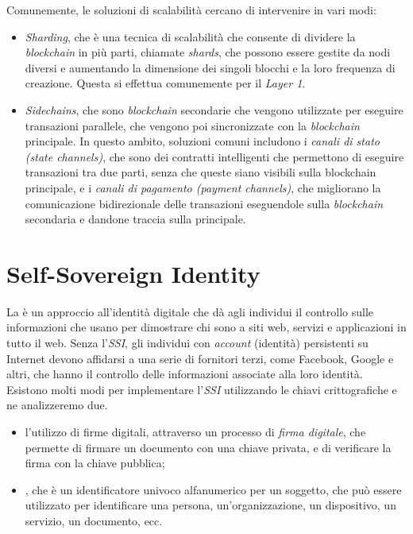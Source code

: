 Comunemente, le soluzioni di scalabilità cercano di intervenire in vari modi:
\begin{itemize}
    \item{\textit{Sharding}}, che è una tecnica di scalabilità che consente di dividere la \textit{blockchain} in più parti, chiamate \textit{shards}, che possono essere gestite da nodi diversi e aumentando
    la dimensione dei singoli blocchi e la loro frequenza di creazione. Questa si effettua comunemente per il \textit{Layer 1}.
    \item{\textit{Sidechains}}, che sono \textit{blockchain} secondarie che vengono utilizzate per eseguire transazioni parallele, che vengono poi sincronizzate con la \textit{blockchain} principale.
    In questo ambito, soluzioni comuni includono i \textit{canali di stato (state channels)}, che sono dei contratti intelligenti che permettono di eseguire transazioni tra due parti, senza che queste siano visibili sulla blockchain principale,
    e i \textit{canali di pagamento (payment channels)}, che migliorano la comunicazione bidirezionale delle transazioni eseguendole sulla \textit{blockchain} secondaria e dandone traccia sulla principale.
\end{itemize}

\section{Self-Sovereign Identity}\label{sec:self-sovereign-identity}

La  è un approccio all'identità digitale che dà agli individui 
il controllo sulle informazioni che usano per dimostrare chi sono a siti web, servizi e applicazioni in tutto il web. 
Senza l'\textit{SSI}, gli individui con \textit{account} (identità) persistenti su Internet devono affidarsi a una serie di fornitori terzi, come Facebook, Google e altri,
che hanno il controllo delle informazioni associate alla loro identità. \\

Esistono molti modi per implementare l'\textit{SSI}  utilizzando le chiavi crittografiche e ne analizzeremo due.
\begin{itemize}
    \item l'utilizzo di firme digitali, attraverso un processo di \textit{firma digitale}, che permette di firmare un documento con una chiave privata, e di verificare la firma con la chiave pubblica;
    \item {}, che è un identificatore univoco alfanumerico per un soggetto, che può essere utilizzato per identificare una persona, un'organizzazione, un dispositivo, un servizio, un documento, ecc.
\end{itemize}  

